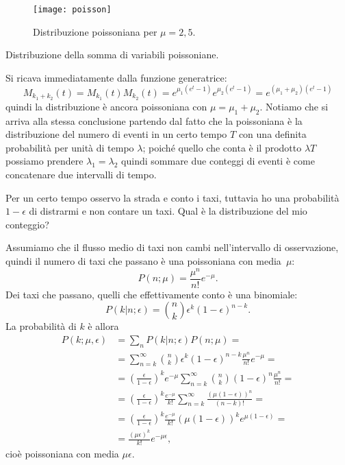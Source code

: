 \begin{figure}
	\centering
	\texttt{[image: poisson]}
	\caption{Distribuzione poissoniana per $\mu=2,5$.}
\end{figure}

\begin{exercise}
	\label{th:sumpoisson}
	Distribuzione della somma di variabili poissoniane.
\end{exercise}

\begin{solution}
	Si ricava immediatamente dalla funzione generatrice:
	\begin{equation*}
		M_{k_1+k_2}(t) =
		M_{k_1}(t)M_{k_2}(t) =
		e^{\mu_1(e^t-1)} e^{\mu_2(e^t-1)} =
		e^{(\mu_1+\mu_2)(e^t-1)}
	\end{equation*}
	quindi la distribuzione è ancora poissoniana con $\mu=\mu_1+\mu_2$.
	Notiamo che si arriva alla stessa conclusione partendo dal fatto che la poissoniana è la distribuzione del numero di eventi in un certo tempo $T$ con una definita probabilità per unità di tempo $\lambda$; poiché quello che conta è il prodotto $\lambda T$ possiamo prendere $\lambda_1=\lambda_2$ quindi sommare due conteggi di eventi è come concatenare due intervalli di tempo.
\end{solution}

\begin{exercise}
	\label{th:taxi}
	Per un certo tempo osservo la strada e conto i taxi,
	tuttavia ho una probabilità $1-\epsilon$ di distrarmi e non contare un taxi.
	Qual è la distribuzione del mio conteggio?
\end{exercise}

\begin{solution*}
	Assumiamo che il flusso medio di taxi non cambi nell'intervallo di osservazione,
	quindi il numero di taxi che passano è una poissoniana con media~$\mu$:
	\begin{equation*}
		P(n;\mu) = \frac{\mu^n}{n!}e^{-\mu}.
	\end{equation*}
	Dei taxi che passano, quelli che effettivamente conto è una binomiale:
	\begin{equation*}
		P(k|n;\epsilon) = \binom nk \epsilon^k (1-\epsilon)^{n-k}.
	\end{equation*}
	La probabilità di $k$ è allora
	\begin{align*}
		P(k;\mu,\epsilon) &=
		\sum_n P(k|n;\epsilon) P(n;\mu) = \\
		&= \sum_{n=k}^\infty \binom nk \epsilon^k (1-\epsilon)^{n-k} \frac{\mu^n}{n!}e^{-\mu} = \\
		&= \left( \frac\epsilon{1-\epsilon} \right)^k e^{-\mu} \sum_{n=k}^\infty \binom nk (1-\epsilon)^n \frac{\mu^n}{n!} = \\
		&= \left( \frac\epsilon{1-\epsilon} \right)^k \frac{e^{-\mu}}{k!} \sum_{n=k}^\infty \frac{(\mu(1-\epsilon))^n}{(n-k)!} = \\
		&= \left( \frac\epsilon{1-\epsilon} \right)^k \frac{e^{-\mu}}{k!} (\mu(1-\epsilon))^k e^{\mu(1-\epsilon)} = \\
		&= \frac{(\mu\epsilon)^k}{k!}e^{-\mu\epsilon},
	\end{align*}
	cioè poissoniana con media $\mu\epsilon$.
\end{solution*}

